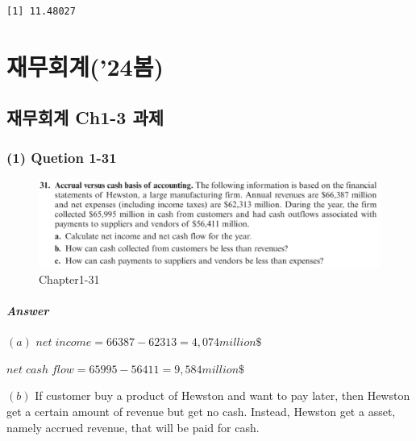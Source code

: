 \documentclass[
  letterpaper,
  DIV=11,
  numbers=noendperiod]{scrreprt}
\begin{document}
\begin{verbatim}
[1] 11.48027
\end{verbatim}

\part{재무회계('24봄)}

\chapter*{재무회계 Ch1-3
과제}\label{uxc7acuxbb34uxd68cuxacc4-ch1-3-uxacfcuxc81c}


\section*{(1) Quetion 1-31}\label{quetion-1-31}


\begin{figure}[H]

{\centering \includegraphics{images/재무회계_hw2_1-31.png}

}

\caption{Chapter1-31}

\end{figure}%

\subsection*{\texorpdfstring{\textbf{\emph{Answer}}}{Answer}}\label{answer-6}

\textbf{\((a)\)} \(net\; income=66387-62313=4,074million\$\)

\(net\; cash\;flow=65995-56411=9,584million\$\)

\textbf{\((b)\)} If customer buy a product of Hewston and want to pay
later, then Hewston get a certain amount of revenue but get no cash.
Instead, Hewston get a asset, namely accrued revenue, that will be paid
for cash.
\end{document}

